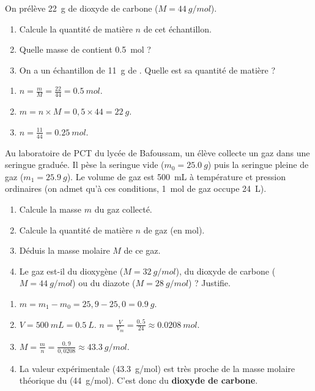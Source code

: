 \documentclass[11pt]{article}
\begin{document}
\begin{exercice}[Utilisation de la relation $n = m/M$]
On prélève \SI{22}{g} de dioxyde de carbone  ($M = \SI{44}{g/mol}$).
\begin{enumerate}
\item Calcule la quantité de matière $n$ de cet échantillon.
\item Quelle masse de  contient \SI{0,5}{mol} ?
\item On a un échantillon de \SI{11}{g} de . Quelle est sa quantité de matière ?
\end{enumerate}
\end{exercice}

\begin{corrige}[Exercice 2]
\begin{enumerate}
\item $n = \frac{m}{M} = \frac{22}{44} = \SI{0,5}{mol}$.
\item $m = n \times M = 0,5 \times 44 = \SI{22}{g}$.
\item $n = \frac{11}{44} = \SI{0,25}{mol}$.
\end{enumerate}
\end{corrige}

\begin{exercice}
Au laboratoire de PCT du lycée de Bafoussam, un élève collecte un gaz dans une seringue graduée. Il pèse la seringue vide ($m_0 = \SI{25,0}{g}$) puis la seringue pleine de gaz ($m_1 = \SI{25,9}{g}$). Le volume de gaz est \SI{500}{mL} à température et pression ordinaires (on admet qu'à ces conditions, \SI{1}{mol} de gaz occupe \SI{24}{L}).
\begin{enumerate}
\item Calcule la masse $m$ du gaz collecté.
\item Calcule la quantité de matière $n$ de gaz (en mol).
\item Déduis la masse molaire $M$ de ce gaz.
\item Le gaz est-il du dioxygène  ($M=\SI{32}{g/mol}$), du dioxyde de carbone  ($M=\SI{44}{g/mol}$) ou du diazote  ($M=\SI{28}{g/mol}$) ? Justifie.
\end{enumerate}
\end{exercice}

\begin{corrige}[Exercice 3]
\begin{enumerate}
\item $m = m_1 - m_0 = 25,9 - 25,0 = \SI{0,9}{g}$.
\item $V = \SI{500}{mL} = \SI{0,5}{L}$. $n = \frac{V}{V_m} = \frac{0,5}{24} \approx \SI{0,0208}{mol}$.
\item $M = \frac{m}{n} = \frac{0,9}{0,0208} \approx \SI{43,3}{g/mol}$.
\item La valeur expérimentale (\SI{43,3}{g/mol}) est très proche de la masse molaire théorique du  (\SI{44}{g/mol}). C'est donc du \textbf{dioxyde de carbone}.
\end{enumerate}
\end{corrige}
\end{document}
